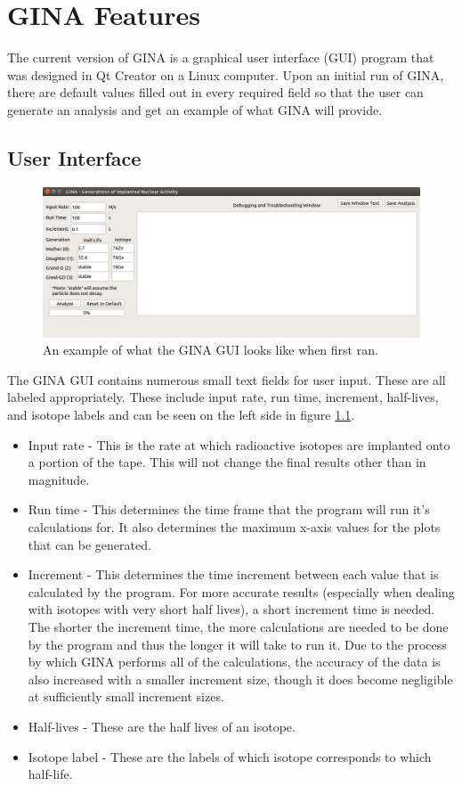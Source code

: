 \chapter{GINA Features}

The current version of GINA is a graphical user interface (GUI) program that was designed in Qt Creator on a Linux computer. Upon an initial run of GINA, there are default values filled out in every required field so that the user can generate an analysis and get an example of what GINA will provide.

\section{User Interface}

\begin{figure}[h!]
	\includegraphics[scale =0.5]{./Images/GINAwindow.png}
	\caption{An example of what the GINA GUI looks like when first ran.}
	\label{fig:gui}
\end{figure}

The GINA GUI contains numerous small text fields for user input. These are all labeled appropriately. These include input rate, run time, increment, half-lives, and isotope labels and can be seen on the left side in figure \ref{fig:gui}.
\begin{itemize}
	\item Input rate - This is the rate at which radioactive isotopes are implanted onto a portion of the tape. This will not change the final results other than in magnitude.
	\item Run time - This determines the time frame that the program will run it's calculations for. It also determines the maximum x-axis values for the plots that can be generated.
	\item Increment - This determines the time increment between each value that is calculated by the program. For more accurate results (especially when dealing with isotopes with very short half lives), a short increment time is needed. The shorter the increment time, the more calculations are needed to be done by the program and thus the longer it will take to run it. Due to the process by which GINA performs all of the calculations, the accuracy of the data is also increased with a smaller increment size, though it does become negligible at sufficiently small increment sizes.
	\item Half-lives - These are the half lives of an isotope.
	\item Isotope label - These are the labels of which isotope corresponds to which half-life.
\end{itemize}

